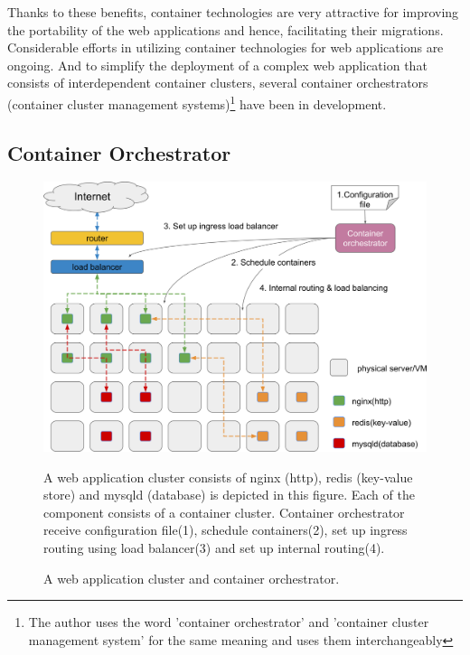 Thanks to these benefits, container technologies are very attractive for improving the portability of the web applications and hence, facilitating their migrations.
Considerable efforts in utilizing container technologies for web applications are ongoing.
And to simplify the deployment of a complex web application that consists of interdependent container clusters, several container orchestrators (container cluster management systems)\footnote{The author uses the word 'container orchestrator' and 'container cluster management system' for the same meaning and uses them interchangeably} have been in development.

\subsection{Container Orchestrator}

\begin{figure}[h]
\begin{center}
\includegraphics[width=0.9\columnwidth]{Figs/container_management_system}
\end{center}
\caption{
A web application cluster and container orchestrator.
}
\centering\parbox[c]{0.9\columnwidth}{
A web application cluster consists of nginx (http), redis (key-value store) and mysqld (database) is depicted in this figure. 
Each of the component consists of a container cluster.
Container orchestrator receive configuration file(1), schedule containers(2), set up ingress routing using load balancer(3) and set up internal routing(4).
}
\label{fig:container_management_system}
\end{figure}

